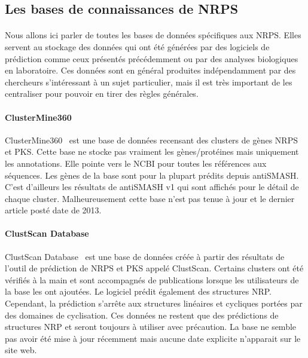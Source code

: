 \documentclass[12pt,french,twoside]{report}
\begin{document}
\subsection{Les bases de connaissances de NRPS}

\paragraph{}Nous allons ici parler de toutes les bases de données spécifiques aux NRPS.
Elles servent au stockage des données qui ont été générées par des logiciels de prédiction comme ceux présentés précédemment ou par des analyses biologiques en laboratoire.
Ces données sont en général produites indépendamment par des chercheurs s'intéressant à un sujet particulier, mais il est très important de les centraliser pour pouvoir en tirer des règles générales.

\paragraph{ClusterMine360}
ClusterMine360~\cite{conway_clustermine360:_2013} est une base de données recensant des clusters de gènes NRPS et PKS.
Cette base ne stocke pas vraiment les gènes/protéines mais uniquement les annotations.
Elle pointe vers le NCBI pour toutes les références aux séquences.
Les gènes de la base sont pour la plupart prédits depuis antiSMASH.
C'est d'ailleurs les résultats de antiSMASH v1 qui sont affichés pour le détail de chaque cluster.
Malheureusement cette base n'est pas tenue à jour et le dernier article posté date de 2013.


\paragraph{ClustScan Database}
ClustScan Database~\cite{diminic_databases_2013} est une base de données créée à partir des résultats de l'outil de prédiction de NRPS et PKS appelé ClustScan.
Certains clusters ont été vérifiés à la main et sont accompagnés de publications lorsque les utilisateurs de la base les ont ajoutées.
Le logiciel prédit également des structures NRP.
Cependant, la prédiction s'arrête aux structures linéaires et cycliques portées par des domaines de cyclisation.
Ces données ne restent que des prédictions de structures NRP et seront toujours à utiliser avec précaution.
La base ne semble pas avoir été mise à jour récemment mais aucune date explicite n'apparait sur le site web.
\end{document}
